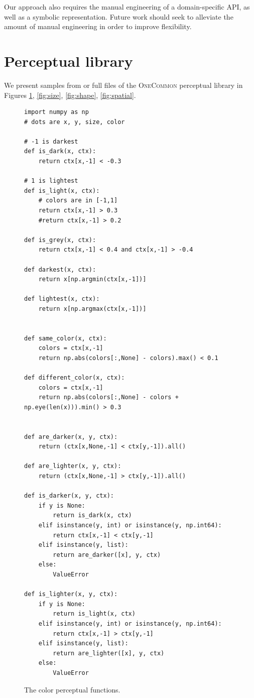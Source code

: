\documentclass[11pt]{article}
\begin{document}
Our approach also requires the manual engineering of a domain-specific API, as well as a symbolic representation. Future work should seek to alleviate the amount of manual engineering in order to improve flexibility.






\appendix

\section{Perceptual library}
\label{sec:library}

We present samples from or full files of the \textsc{OneCommon} perceptual library in Figures \ref{fig:color}, \ref{fig:size}, \ref{fig:shape}, \ref{fig:spatial}.

\lstset{basicstyle=\footnotesize\ttfamily,breaklines=true}

\begin{figure}
\begin{lstlisting}
import numpy as np
# dots are x, y, size, color

# -1 is darkest
def is_dark(x, ctx):
    return ctx[x,-1] < -0.3

# 1 is lightest
def is_light(x, ctx):
    # colors are in [-1,1]
    return ctx[x,-1] > 0.3
    #return ctx[x,-1] > 0.2

def is_grey(x, ctx):
    return ctx[x,-1] < 0.4 and ctx[x,-1] > -0.4

def darkest(x, ctx):
    return x[np.argmin(ctx[x,-1])]

def lightest(x, ctx):
    return x[np.argmax(ctx[x,-1])]


def same_color(x, ctx):
    colors = ctx[x,-1]
    return np.abs(colors[:,None] - colors).max() < 0.1

def different_color(x, ctx):
    colors = ctx[x,-1]
    return np.abs(colors[:,None] - colors + np.eye(len(x))).min() > 0.3


def are_darker(x, y, ctx):
    return (ctx[x,None,-1] < ctx[y,-1]).all()

def are_lighter(x, y, ctx):
    return (ctx[x,None,-1] > ctx[y,-1]).all()

def is_darker(x, y, ctx):
    if y is None:
        return is_dark(x, ctx)
    elif isinstance(y, int) or isinstance(y, np.int64):
        return ctx[x,-1] < ctx[y,-1]
    elif isinstance(y, list):
        return are_darker([x], y, ctx)
    else:
        ValueError
        
def is_lighter(x, y, ctx):
    if y is None:
        return is_light(x, ctx)
    elif isinstance(y, int) or isinstance(y, np.int64):
        return ctx[x,-1] > ctx[y,-1]
    elif isinstance(y, list):
        return are_lighter([x], y, ctx)
    else:
        ValueError
\end{lstlisting}
\caption{The color perceptual functions.}
\label{fig:color}
\end{figure}
\end{document}

